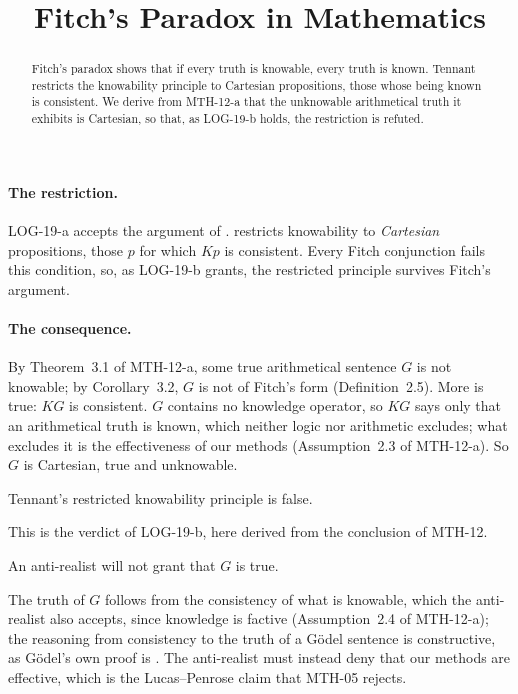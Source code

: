 \documentclass{situationist-preprint}
\title{Fitch's Paradox in Mathematics}
\begin{document}
\maketitle

\begin{abstract}
Fitch's paradox shows that if every truth is knowable, every truth is known. Tennant restricts the knowability principle to Cartesian propositions, those whose being known is consistent. We derive from MTH-12-a that the unknowable arithmetical truth it exhibits is Cartesian, so that, as LOG-19-b holds, the restriction is refuted.
\end{abstract}

\paragraph{The restriction.} LOG-19-a accepts the argument of \citet{Fitch1963}. \citet{Tennant1997} restricts knowability to \emph{Cartesian} propositions, those $p$ for which $Kp$ is consistent. Every Fitch conjunction fails this condition, so, as LOG-19-b grants, the restricted principle survives Fitch's argument.

\paragraph{The consequence.} By Theorem~3.1 of MTH-12-a, some true arithmetical sentence $G$ is not knowable; by Corollary~3.2, $G$ is not of Fitch's form (Definition~2.5). More is true: $KG$ is consistent. $G$ contains no knowledge operator, so $KG$ says only that an arithmetical truth is known, which neither logic nor arithmetic excludes; what excludes it is the effectiveness of our methods (Assumption~2.3 of MTH-12-a). So $G$ is Cartesian, true and unknowable.

\begin{proposition}
Tennant's restricted knowability principle is false.
\end{proposition}

\noindent This is the verdict of LOG-19-b, here derived from the conclusion of MTH-12.

\begin{objection}
An anti-realist will not grant that $G$ is true.
\end{objection}

\begin{reply}
The truth of $G$ follows from the consistency of what is knowable, which the anti-realist also accepts, since knowledge is factive (Assumption~2.4 of MTH-12-a); the reasoning from consistency to the truth of a Gödel sentence is constructive, as Gödel's own proof is \citep{Goedel1931}. The anti-realist must instead deny that our methods are effective, which is the Lucas--Penrose claim that MTH-05 rejects.
\end{reply}
\end{document}
